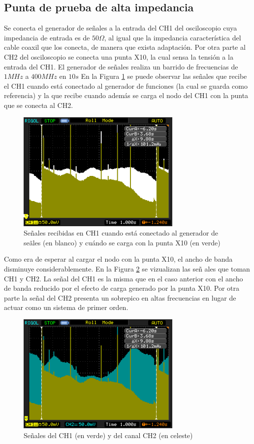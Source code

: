 \documentclass[a4paper,10pt]{article}
\begin{document}
		\subsection{Punta de prueba de alta impedancia}
		Se conecta el generador de se\~nales a la entrada del CH1 del osciloscopio cuya impedancia de entrada es de $50 \Omega$, al igual que la impedancia caracter\'istica del cable coaxil que los conecta, de manera que exista adaptaci\'on. Por otra parte al CH2 del osciloscopio se conecta una punta X10, la cual sensa la tensi\'on a la entrada del CH1.
		El generador de se\~nales realiza un barrido de frecuencias de $1MHz$ a $400MHz$ en $10s$
		En la Figura \ref{img001} se puede observar las se\~nales que recibe el CH1 cuando est\'a conectado al generador de funciones (la cual se guarda como referencia) y la que recibe cuando adem\'as se carga el nodo del CH1 con la punta que se conecta al CH2.
			\begin{figure}[!htb]
				\centering
				\includegraphics[width=8cm]{Imagenes/Mediciones instrumentos/NewFile1.png}
				\caption{Se\~nales recibidas en CH1 cuando est\'a conectado al generador de se\~ales (en blanco) y cu\'ando se carga con la punta X10 (en verde)} \label{img001}
			\end{figure}
			
		Como era de esperar al cargar el nodo con la punta X10, el ancho de banda disminuye considerablemente.
		En la Figura \ref{img000} se vizualizan las se\~n ales que toman CH1 y CH2. La se\~nal del CH1 es la misma que en el caso anterior con el ancho de banda reducido por el efecto de carga generado por la punta X10. Por otra parte la se\~nal del CH2 presenta un sobrepico en altas frecuencias en lugar de actuar como un sistema de primer orden.
			\begin{figure}[!htb]
				\centering
				\includegraphics[width=8cm]{Imagenes/Mediciones instrumentos/NewFile0.png}
				\caption{Se\~nales del CH1 (en verde) y del canal CH2 (en celeste)} \label{img000}
			\end{figure}
									
\end{document}
